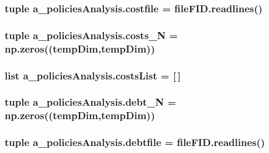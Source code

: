 \hypertarget{namespacea__policies_analysis_aedb8aad3a5765a23d90c365e115a6191}{
\subsubsection[{costfile}]{\setlength{\rightskip}{0pt plus 5cm}tuple a\-\_\-policies\-Analysis.\-costfile = file\-F\-I\-D.\-readlines()}}\label{namespacea__policies_analysis_aedb8aad3a5765a23d90c365e115a6191}
\hypertarget{namespacea__policies_analysis_a018a03be06a736dd0e147972467aea8c}{
\subsubsection[{costs\-\_\-\-N}]{\setlength{\rightskip}{0pt plus 5cm}tuple a\-\_\-policies\-Analysis.\-costs\-\_\-\-N = np.\-zeros(({\bf temp\-Dim},{\bf temp\-Dim}))}}\label{namespacea__policies_analysis_a018a03be06a736dd0e147972467aea8c}
\hypertarget{namespacea__policies_analysis_ac2808691a02e6611d1e62cace51d2413}{
\subsubsection[{costs\-List}]{\setlength{\rightskip}{0pt plus 5cm}list a\-\_\-policies\-Analysis.\-costs\-List = \mbox{[}$\,$\mbox{]}}}\label{namespacea__policies_analysis_ac2808691a02e6611d1e62cace51d2413}
\hypertarget{namespacea__policies_analysis_af2678289e52761c3f7e4faafcbb4d618}{
\subsubsection[{debt\-\_\-\-N}]{\setlength{\rightskip}{0pt plus 5cm}tuple a\-\_\-policies\-Analysis.\-debt\-\_\-\-N = np.\-zeros(({\bf temp\-Dim},{\bf temp\-Dim}))}}\label{namespacea__policies_analysis_af2678289e52761c3f7e4faafcbb4d618}
\hypertarget{namespacea__policies_analysis_a58b36724729244e0f335c0f69a2f6785}{
\subsubsection[{debtfile}]{\setlength{\rightskip}{0pt plus 5cm}tuple a\-\_\-policies\-Analysis.\-debtfile = file\-F\-I\-D.\-readlines()}}\label{namespacea__policies_analysis_a58b36724729244e0f335c0f69a2f6785}
